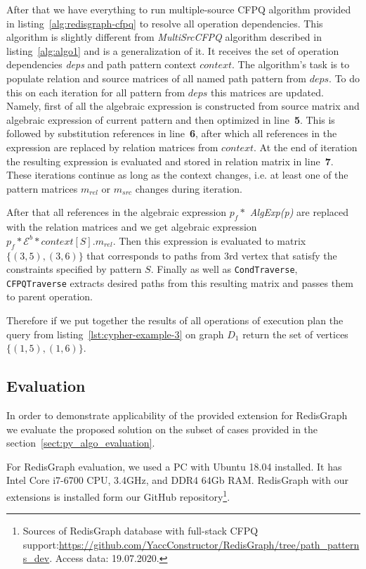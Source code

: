 After that we have everything to run multiple-source CFPQ algorithm provided in listing~\autoref{alg:redisgraph-cfpq} to resolve all operation dependencies. This algorithm is slightly different from \textit{MultiSrcCFPQ} algorithm described in listing~\autoref{alg:algo1} and is a generalization of it. It receives the set of operation dependencies \textit{deps} and path pattern context $context$. The algorithm's task is to populate relation and source matrices of all named path pattern from $deps$. To do this on each iteration for all pattern from $deps$ this matrices are updated. Namely, first of all the algebraic expression is constructed from source matrix and algebraic expression of current pattern and then optimized in line~\textbf{5}. This is followed by substitution references in line~\textbf{6}, after which all references in the expression are replaced by relation matrices from $context$. At the end of iteration the resulting expression is evaluated and stored in relation matrix in line~\textbf{7}. These iterations continue as long as the context changes, i.e. at least one of the pattern matrices $m_{rel}$ or $m_{src}$ changes during iteration.


After that all references in the algebraic expression $p_f *$ \textit{Alg\-Exp(p)} are replaced with the relation matrices and we get algebraic expression $p_f * \mathcal{E}^b * context[S].m_{rel}$. Then this expression is evaluated to matrix $\{(3, 5), (3, 6)\}$ that corresponds to paths from 3rd vertex that satisfy the constraints specified by pattern $S$. Finally as well as \lstinline{CondTraverse}, \lstinline{CFPQTraverse} extracts desired paths from this resulting matrix and passes them to parent operation.

Therefore if we put together the results of all operations of execution plan the query from listing~\ref{lst:cypher-example-3} on graph $D_1$ return the set of vertices $\{(1, 5), (1, 6)\}$.

\subsection{Evaluation}

In order to demonstrate applicability of the provided extension for RedisGraph we evaluate the proposed solution on the subset of cases provided in the section~\ref{sect:py_algo_evaluation}.

For RedisGraph evaluation, we used a PC with Ubuntu 18.04 installed.
It has Intel Core i7-6700 CPU, 3.4GHz, and DDR4 64Gb RAM. 
RedisGraph with our extensions is installed form our GitHub repository\footnote{Sources of RedisGraph database with full-stack CFPQ support:\url{https://github.com/YaccConstructor/RedisGraph/tree/path_patterns_dev}. Access data: 19.07.2020.}. 

